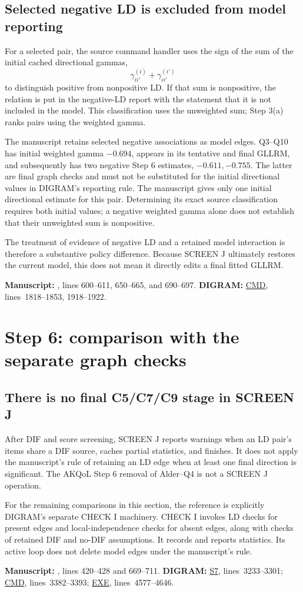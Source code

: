 \documentclass[11pt,a4paper]{article}
\newcommand{\src}[2]{\hyperlink{source-#1}{\textsf{#1}}, lines~#2}
\newcommand{\trace}[2]{%
  \par\smallskip
  {\footnotesize\color{tracegray}\textbf{Manuscript:} #1.\quad
  \textbf{DIGRAM:} #2.\par}\medskip}
\newcommand{\finding}[1]{\Needspace{5\baselineskip}\subsection{#1}}
\begin{document}
\finding{Selected negative LD is excluded from model reporting}
\label{sec:negative}
For a selected pair, the source command handler uses the sign of the
sum of the initial cached directional gammas,
\[
 \gamma_{ii'}^{(i)}+\gamma_{ii'}^{(i')}
\]
to distinguish positive from nonpositive LD. If that sum is nonpositive,
the relation is put in the negative-LD report with the statement that it
is not included in the model. This classification uses the unweighted sum;
Step 3(a) ranks pairs using the weighted gamma.

The manuscript retains selected negative associations as model edges.
Q3--Q10 has initial weighted gamma \(-0.694\), appears in its tentative
and final GLLRM, and subsequently has two negative Step 6 estimates,
\(-0.611,-0.755\). The latter are final graph checks and must not be
substituted for the initial directional values in DIGRAM's reporting rule.
The manuscript gives only one initial directional estimate for this pair.
Determining its exact source classification requires both initial values;
a negative weighted gamma alone does not establish that their unweighted
sum is nonpositive.

The treatment of evidence of negative LD and a retained model interaction
is therefore a substantive policy difference. Because SCREEN J ultimately
restores the current model, this does not mean it directly edits a final
fitted GLLRM.
\trace{, lines 600--611, 650--665, and 690--697}
{\src{CMD}{1818--1853, 1918--1922}}

\section{Step 6: comparison with the separate graph checks}
\label{sec:step6}
\finding{There is no final C5/C7/C9 stage in SCREEN J}
After DIF and score screening, SCREEN J reports warnings when an LD pair's
items share a DIF source, caches partial statistics, and finishes.
It does not apply the manuscript's rule of retaining an LD edge when
at least one final direction is significant.
The AKQoL Step 6 removal of Alder--Q4 is not a SCREEN J operation.

For the remaining comparisons in this section, the reference is explicitly
DIGRAM's separate CHECK I machinery. CHECK I invokes LD checks for present
edges and local-independence checks for absent edges, along with checks of
retained DIF and no-DIF assumptions. It records and reports statistics.
Its active loop does not delete model edges under the manuscript's rule.
\trace{, lines 420--428 and 669--711}
{\src{S7}{3233--3301}; \src{CMD}{3382--3393};
 \src{EXE}{4577--4646}}
\end{document}
